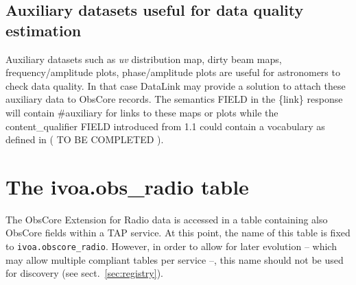 \documentclass[11pt,a4paper]{ivoa}
\begin{document}
\subsection{Auxiliary datasets useful for data quality estimation}

Auxiliary datasets such as  \emph{uv} distribution map, dirty beam maps, frequency/amplitude plots, phase/amplitude plots are useful for astronomers to check data quality.
In that case DataLink \citep{2015ivoa.spec.0617D} may provide a solution to attach these auxiliary data to ObsCore records. The semantics FIELD in the \{link\}
response  will contain \#auxiliary  for links to these maps or plots while  the content\_qualifier FIELD introduced from 1.1  could contain a vocabulary as defined in ( TO BE COMPLETED ).


\section{The ivoa.obs\_radio table}
\label{sec:implementation}
%
%
%
The ObsCore Extension for Radio data is accessed in a table containing also ObsCore fields within a TAP
\citep{2019ivoa.spec.0927D} service. At this
point, the name of this table is fixed to \verb|ivoa.obscore_radio|.
However, in order to allow for later evolution -- which may allow
multiple compliant tables per service --, this name should not be used
for discovery (see sect.~\ref{sec:registry}).
\end{document}
